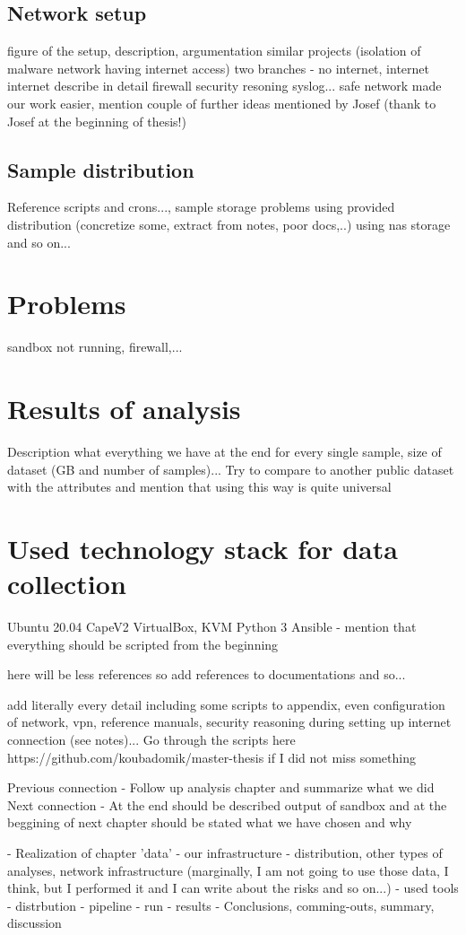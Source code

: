 \subsection{Network setup}
figure of the setup, description, argumentation
similar projects (isolation of malware network having internet access)
two branches - no internet, internet
internet
    describe in detail
    firewall
    security resoning
    syslog...
safe network made our work easier, mention couple of further ideas mentioned by Josef (thank to Josef at the beginning of thesis!)
\subsection{Sample distribution}
Reference scripts and crons..., sample storage
problems using provided distribution (concretize some, extract from notes, poor docs,..)
using nas storage and so on...

\section{Problems}
sandbox not running, firewall,...

\section{Results of analysis}
Description what everything we have at the end for every single sample, size of dataset (GB and number of samples)...
Try to compare to another public dataset with the attributes and mention that using this way is quite universal

\section{Used technology stack for data collection}
Ubuntu 20.04
CapeV2
VirtualBox, KVM
Python 3
Ansible - mention that everything should be scripted from the beginning



here will be less references so add references to documentations and so...

add literally every detail including some scripts to appendix, even configuration of network, vpn, reference manuals, security reasoning during setting up internet connection (see notes)...
Go through the scripts here https://github.com/koubadomik/master-thesis if I did not miss something

 


Previous connection
- Follow up analysis chapter and summarize what we did
Next connection
- At the end should be described output of sandbox and at the beggining of next chapter should be stated what we have chosen and why



- Realization of chapter 'data'
- our infrastructure - distribution, other types of analyses, network infrastructure (marginally, I am not going to use those data, I think, but I performed it and I can write about the risks and so on...)
- used tools
- distrbution
- pipeline
- run
- results
- Conclusions, comming-outs, summary, discussion